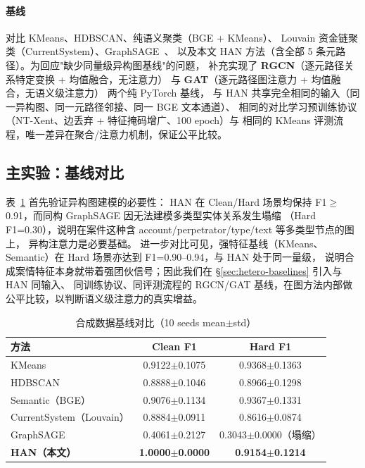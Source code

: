 \documentclass[12pt,a4paper]{ctexart}
\begin{document}
\paragraph{基线} 对比 KMeans、HDBSCAN、纯语义聚类（BGE + KMeans）、
Louvain 资金链聚类（CurrentSystem）、GraphSAGE~\cite{hamilton2017graphsage}、
以及本文 HAN 方法（含全部 5 条元路径）。为回应"缺少同量级异构图基线"的问题，
补充实现了 \textbf{RGCN}（逐元路径关系特定变换 + 均值融合，无注意力）\cite{schlichtkrull2018rgcn} 与
\textbf{GAT}（逐元路径图注意力 + 均值融合，无语义级注意力）\cite{velickovic2018gat} 两个纯 PyTorch 基线，
与 HAN 共享完全相同的输入（同一异构图、同一元路径邻接、同一 BGE 文本通道）、
相同的对比学习预训练协议（NT-Xent、边丢弃 + 特征掩码增广、100 epoch）与
相同的 KMeans 评测流程，唯一差异在聚合/注意力机制，保证公平比较。

\subsection{主实验：基线对比}

表~\ref{tab:baselines} 首先验证异构图建模的必要性：
HAN 在 Clean/Hard 场景均保持 F1$\ge$0.91，而同构 GraphSAGE 因无法建模多类型实体关系发生塌缩
（Hard F1=0.30），说明在案件这种含 account/perpetrator/type/text 等多类型节点的图上，
异构注意力是必要基础。
进一步对比可见，强特征基线（KMeans、Semantic）在 Hard 场景亦达到 F1=0.90--0.94，与 HAN 处于同一量级，
说明合成案情特征本身就带着强团伙信号；因此我们在 \S\ref{sec:hetero-baselines} 引入与 HAN 同输入、
同训练协议、同评测流程的 RGCN/GAT 基线，在图方法内部做公平比较，以判断语义级注意力的真实增益。

\begin{table}[htbp]
  \centering
  \caption{合成数据基线对比（10 seeds mean$\pm$std）}
  \label{tab:baselines}
  \begin{tabular}{lcc}
    \toprule
    方法 & Clean F1 & Hard F1 \\
    \midrule
    KMeans & 0.9122$\pm$0.1075 & 0.9368$\pm$0.1363 \\
    HDBSCAN & 0.8888$\pm$0.1046 & 0.8966$\pm$0.1298 \\
    Semantic（BGE） & 0.9076$\pm$0.1134 & 0.9367$\pm$0.1331 \\
    CurrentSystem（Louvain） & 0.8884$\pm$0.0911 & 0.8616$\pm$0.0874 \\
    GraphSAGE & 0.4061$\pm$0.2127 & 0.3043$\pm$0.0000（塌缩） \\
    \textbf{HAN（本文）} & \textbf{1.0000$\pm$0.0000} & \textbf{0.9154$\pm$0.1214} \\
    \bottomrule
  \end{tabular}
\end{table}
\end{document}
